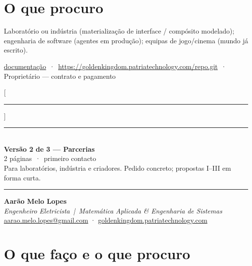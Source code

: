 \documentclass[11pt,a4paper]{article}
\newcommand{\divisa}[3]{%
  \noindent\rule{\textwidth}{1.2pt}\\[6pt]
  {\large\bfseries #1}\\[2pt]
  {\color{cinza}\small #2}\\[4pt]
  {\small #3}\\[6pt]
  \noindent\rule{\textwidth}{0.4pt}\par
  \vspace{8pt}%
}
\begin{document}
\section*{O que procuro}

Laboratório ou indústria (materialização de interface / compósito modelado);
engenharia de software (agentes em produção); equipas de jogo/cinema (mundo já escrito).

\smallskip
\begin{center}\footnotesize
\href{https://goldenkingdom.patriatechnology.com/docs/}{documentação}
\,·\,
\href{https://goldenkingdom.patriatechnology.com/repo.git}{https://goldenkingdom.patriatechnology.com/repo.git}
\,·\,
Proprietário — contrato e pagamento
\end{center}

\newpage
\titlespacing{\section}{0pt}{9pt}{4pt}
\titleformat{\section}{\large\bfseries}{}{0pt}{}[\vspace{-6pt}\rule{\textwidth}{0.4pt}]

\divisa{Versão 2 de 3 --- Parcerias}
{2 páginas \,·\, primeiro contacto}
{Para laboratórios, indústria e criadores. Pedido concreto; propostas I--III em forma curta.}


\begin{center}
{\LARGE\bfseries Aarão Melo Lopes}\\[2pt]
{\color{cinza}\emph{Engenheiro Eletricista \,|\, Matemática Aplicada \& Engenharia de Sistemas}}\\[2pt]
{\small
\href{mailto:aarao.melo.lopes@gmail.com}{aarao.melo.lopes@gmail.com}
\quad·\quad
\href{https://goldenkingdom.patriatechnology.com}{goldenkingdom.patriatechnology.com}}
\end{center}

\vspace{-2pt}
\section*{O que faço e o que procuro}
\end{document}
